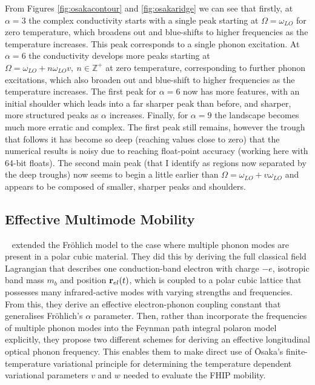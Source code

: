 From Figures \ref{fig:osakacontour} and \ref{fig:osakaridge} we can see that firstly, at $\alpha = 3$ the complex conductivity starts with a single peak starting at $\Omega = \omega_{LO}$ for zero temperature, which broadens out and blue-shifts to higher frequencies as the temperature increases. This peak corresponds to a single phonon excitation. At $\alpha = 6$ the conductivity develops more peaks starting at $\Omega = \omega_{LO} + n \omega_{LO} v,\ n \in \mathbb{Z}^+$ at zero temperature, corresponding to further phonon excitations, which also broaden out and blue-shift to higher frequencies as the temperature increases. The first peak for $\alpha = 6$ now has more features, with an initial shoulder which leads into a far sharper peak than before, and sharper, more structured peaks as $\alpha$ increases. Finally, for $\alpha = 9$ the landscape becomes much more erratic and complex. The first peak still remains, however the trough that follows it has become so deep (reaching values close to zero) that the numerical results is noisy due to reaching float-point accuracy (working here with 64-bit floats). The second main peak (that I identify as regions now separated by the deep troughs) now seems to begin a little earlier than $\Omega = \omega_{LO} + v \omega_{LO}$ and appears to be composed of smaller, sharper peaks and shoulders. 

\subsection{Effective Multimode Mobility}
\label{subsec:2-3-3}

~\cite{hellwarth_mobility_1999} extended the Fr\"ohlich model to the case where multiple phonon modes are present in a polar cubic material. They did this by deriving the full classical field Lagrangian that describes one conduction-band electron with charge $-e$, isotropic band mass $m_b$ and position $\vb{r}_{el}(t)$, which is coupled to a polar cubic lattice that possesses many infrared-active modes with varying strengths and frequencies. From this, they derive an effective electron-phonon coupling constant that generalises Fr\"ohlich's $\alpha$ parameter. Then, rather than incorporate the frequencies of multiple phonon modes into the Feynman path integral polaron model explicitly, they propose two different schemes for deriving an effective longitudinal optical phonon frequency. This enables them to make direct use of \=Osaka's finite-temperature variational principle for determining the temperature dependent variational parameters $v$ and $w$ needed to evaluate the FHIP mobility. 

